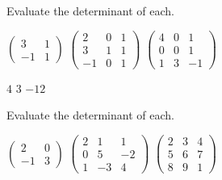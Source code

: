 \begin{exercises}
  \recommended \item 
     Evaluate the determinant of each.
     \begin{exparts*}
       \partsitem \(
            \begin{pmatrix}
                3    &1   \\
               -1    &1
            \end{pmatrix}    \)
       \partsitem \(
            \begin{pmatrix}
                2    &0   &1  \\
                3    &1   &1 \\
               -1    &0   &1
            \end{pmatrix}    \)
       \partsitem \(
            \begin{pmatrix}
                4    &0   &1  \\
                0    &0   &1 \\
                1    &3   &-1
            \end{pmatrix}    \)
     \end{exparts*}
     \begin{answer}
       \begin{exparts*}
         \partsitem \( 4 \)
         \partsitem \( 3 \)
         \partsitem \( -12 \)
       \end{exparts*}  
     \end{answer}
  \item 
     Evaluate the determinant of each.
     \begin{exparts*}
        \partsitem \( \begin{pmatrix}
                    2  &0  \\
                   -1  &3
                 \end{pmatrix} \)
        \partsitem \( \begin{pmatrix}
                    2  &1  &1  \\
                    0  &5  &-2 \\
                    1  &-3 &4
                 \end{pmatrix} \)
        \partsitem \( \begin{pmatrix}
                    2  &3  &4  \\
                    5  &6  &7  \\
                    8  &9  &1
                 \end{pmatrix} \)
     \end{exparts*}

\end{exercises}
